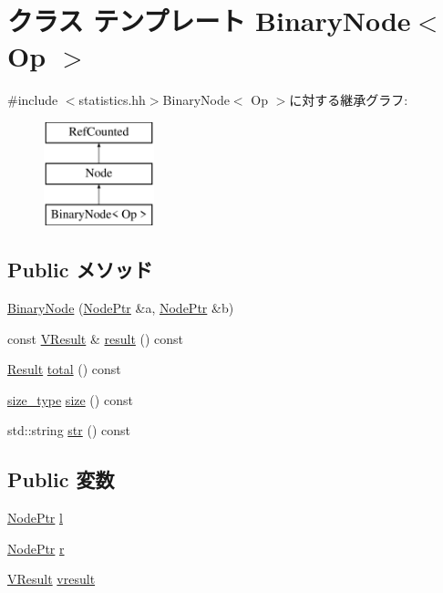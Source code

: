 \hypertarget{classStats_1_1BinaryNode}{
\section{クラス テンプレート BinaryNode$<$ Op $>$}
\label{classStats_1_1BinaryNode}
}


{\ttfamily \#include $<$statistics.hh$>$}BinaryNode$<$ Op $>$に対する継承グラフ:\begin{figure}[H]
\begin{center}
\leavevmode
\includegraphics[height=3cm]{classStats_1_1BinaryNode}
\end{center}
\end{figure}
\subsection*{Public メソッド}
\begin{DoxyCompactItemize}
\item 
\hyperlink{classStats_1_1BinaryNode_ac16f666cd797937f986fa7ed3530dc69}{BinaryNode} (\hyperlink{classRefCountingPtr}{NodePtr} \&a, \hyperlink{classRefCountingPtr}{NodePtr} \&b)
\item 
const \hyperlink{classstd_1_1vector}{VResult} \& \hyperlink{classStats_1_1BinaryNode_aba312f9e3431b1652f8b3ddf3fe105dc}{result} () const 
\item 
\hyperlink{namespaceStats_ad874d2cfd4b4a29ebd480bb2e67f20ae}{Result} \hyperlink{classStats_1_1BinaryNode_a35c6e2ed3fc81b40d69052a062113ead}{total} () const 
\item 
\hyperlink{namespaceStats_ada51e68d31936547d3729c82daf6b7c6}{size\_\-type} \hyperlink{classStats_1_1BinaryNode_a503ab01f6c0142145d3434f6924714e7}{size} () const 
\item 
std::string \hyperlink{classStats_1_1BinaryNode_a1b9b8885b0880fc4ddf9a2c7d1ca3dc4}{str} () const 
\end{DoxyCompactItemize}
\subsection*{Public 変数}
\begin{DoxyCompactItemize}
\item 
\hyperlink{classRefCountingPtr}{NodePtr} \hyperlink{classStats_1_1BinaryNode_a6ad7f056f60bd5cfec2caa5d5f4e363f}{l}
\item 
\hyperlink{classRefCountingPtr}{NodePtr} \hyperlink{classStats_1_1BinaryNode_aa3722e7d196563badabbb861eda68230}{r}
\item 
\hyperlink{classstd_1_1vector}{VResult} \hyperlink{classStats_1_1BinaryNode_a8f41af856442757ec68f3391333d3eb2}{vresult}
\end{DoxyCompactItemize}
